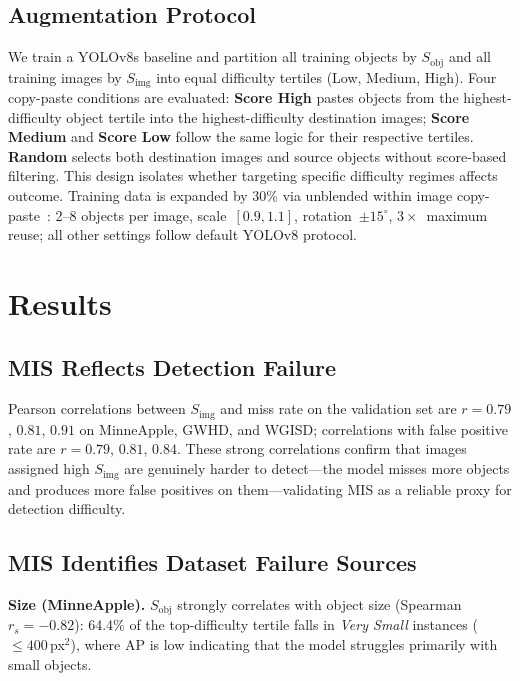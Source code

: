 \documentclass[conference]{IEEEtran}
\begin{document}
\subsection{Augmentation Protocol}
We train a YOLOv8s baseline and partition all training objects by
$S_{\mathrm{obj}}$ and all training images by $S_{\mathrm{img}}$ into
equal difficulty tertiles (Low, Medium, High).
Four copy-paste conditions are evaluated:
\textbf{Score High} pastes objects from the highest-difficulty object
tertile into the highest-difficulty destination images;
\textbf{Score Medium} and \textbf{Score Low} follow the same logic
for their respective tertiles.
\textbf{Random} selects both destination images and source objects
without score-based filtering.
This design isolates whether targeting specific difficulty regimes
affects outcome. Training data is expanded by 30\% via unblended within image
copy-paste~\cite{kisantal2019augmentation}: 2--8 objects per image,
scale~$[0.9,1.1]$, rotation~$\pm15^\circ$, $3{\times}$~maximum
reuse; all other settings follow default YOLOv8 protocol.

\section{Results}
\subsection{MIS Reflects Detection Failure}

Pearson correlations between $S_{\mathrm{img}}$ and miss rate
on the validation set are $r{=}0.79$, $0.81$, $0.91$ on
MinneApple, GWHD, and WGISD; correlations with false positive rate are
$r{=}0.79$, $0.81$, $0.84$. These strong correlations confirm
that images assigned high $S_{\mathrm{img}}$ are genuinely
harder to detect---the model misses more objects and produces
more false positives on them---validating MIS as a reliable
proxy for detection difficulty.

\subsection{MIS Identifies Dataset Failure Sources}

\textbf{Size (MinneApple).}
$S_{\mathrm{obj}}$ strongly correlates with object size
(Spearman~$r_s{=}{-}0.82$): 64.4\% of the top-difficulty
tertile falls in \textit{Very Small} instances
(${\le}400$\,px$^2$), where AP is low 
indicating that the model struggles primarily with
small objects.
\end{document}
